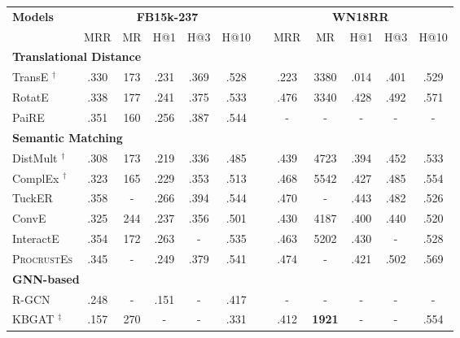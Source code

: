 \documentclass[letterpaper]{article} \usepackage{aaai22}  \usepackage{times}  \usepackage{helvet}  \usepackage{courier}  \usepackage[hyphens]{url}  \usepackage{graphicx} \urlstyle{rm} \def\UrlFont{\rm}  \usepackage{natbib}  \usepackage{caption} \DeclareCaptionStyle{ruled}{labelfont=normalfont,labelsep=colon,strut=off} \frenchspacing  \setlength{\pdfpagewidth}{8.5in}  \setlength{\pdfpageheight}{11in}  \usepackage{algorithm}
\begin{document}
\begin{table*}
    \setlength\tabcolsep{5.7pt}
    \renewcommand\arraystretch{1.1}
    \centering
    \begin{tabular}{lccccccccccc}
      \toprule
      \multirow{2}{*}{\textbf{Models}} & \multicolumn{5}{c}{\textbf{FB15k-237}} & & \multicolumn{5}{c}{\textbf{WN18RR}} \\
      \cline{2-6} \cline{8-12}
      & MRR & MR & H@1 & H@3 & H@10 & & MRR & MR & H@1 & H@3 & H@10 \\
      \hline \hline
      \multicolumn{12}{l}{\textbf{Translational Distance}} \\
      TransE \cite{NeurIPS_2013_Bordes_TransE}$^{\dagger}$     & .330 & 173 & .231 & .369 & .528 & & .223 & 3380 & .014 & .401 & .529 \\
      RotatE \cite{ICLR_2019_Sun_RotatE}      & .338 & 177 & .241 & .375 & .533 & & .476 & 3340 & .428 & .492 & .571 \\
      PaiRE \cite{ACL_2021_Chao_PaiRE}        & .351 & 160 & .256 & .387 & .544 & & - & - & - & - & - \\
      \hline
      \multicolumn{12}{l}{\textbf{Semantic Matching}} \\ 
      DistMult \cite{ICLR_2015_Yang_DistMult}$^{\dagger}$      & .308 & 173 & .219 & .336 & .485 & & .439 & 4723 & .394 & .452 & .533 \\
      ComplEx  \cite{ICML_2016_Trouillon_ComplEx}$^{\dagger}$ & .323 & 165 & .229 & .353 & .513 & & .468 & 5542 & .427 & .485 & .554 \\
      TuckER\cite{EMNLP_2019_Balazevic_TuckER} & .358 & -   & .266 & .394 & .544 & & .470 & -    & .443 & .482 & .526 \\
      ConvE  \cite{AAAI_2018_Dettmers_ConvE_WN18RR} & .325 & 244 & .237 & .356 & .501 & & .430 & 4187 & .400 & .440 & .520\\
      InteractE \cite{AAAI_2020_Vashishth_InteractE} & .354 & 172 & .263 & - & .535 & & .463 & 5202 & .430 & - & .528\\ 
      \textsc{ProcrustEs} \cite{NAACL_2021_Peng_ProcrustEs} & .345 & - & .249 & .379 & .541 & & .474 & - & .421 & .502 & .569\\ 
      \hline
      \multicolumn{12}{l}{\textbf{GNN-based}} \\ 
      R-GCN \cite{ESWC_2018_Schlichtkrull_R-GCN}      & .248 & -   & .151 & - & .417 & & -  & -  & -  & - & -    \\
      KBGAT \cite{ACL_2019_Nathani_KBGAT}$^{\ddagger}$     & .157 & 270 & - & - & .331 & & .412 & \textbf{1921} & - & - & .554 \\

\end{tabular}
\end{table*}
\end{document}
